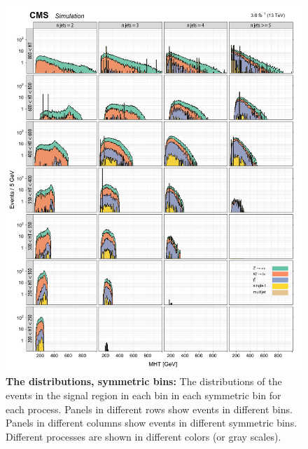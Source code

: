 \begin{figure}[!h]
\centering
\includegraphics[scale=0.95]{figures/kiplots/c150107_s150318_f015_MHT_100}
\caption{\textbf{\boldmath The \mht distributions, symmetric \njet
bins:} The \mht distributions of the events in the signal region in each
\scalht bin in each symmetric \njet bin for each process. Panels in
different rows show events in different \scalht bins. Panels in
different columns show events in different symmetric \njet bins.
Different processes are shown in different colors (or gray scales).}
\label{c150107_s150318_f015_MHT_100}
\end{figure}

